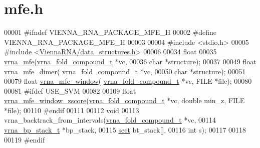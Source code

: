 \hypertarget{mfe_8h_source}{}\section{mfe.\+h}
\label{mfe_8h_source}

\begin{DoxyCode}
00001 \textcolor{preprocessor}{#ifndef VIENNA\_RNA\_PACKAGE\_MFE\_H}
00002 \textcolor{preprocessor}{#define VIENNA\_RNA\_PACKAGE\_MFE\_H}
00003 
00004 \textcolor{preprocessor}{#include <stdio.h>}
00005 \textcolor{preprocessor}{#include <\hyperlink{data__structures_8h}{ViennaRNA/data\_structures.h}>}
00006 
00034 \textcolor{keywordtype}{float}
00035 \hyperlink{group__mfe__fold_gabd3b147371ccf25c577f88bbbaf159fd}{vrna\_mfe}(\hyperlink{group__fold__compound_structvrna__fc__s}{vrna\_fold\_compound\_t} *vc,
00036           \textcolor{keywordtype}{char} *structure);
00037 
00049 \textcolor{keywordtype}{float} \hyperlink{group__mfe__cofold_gaab22d10c1190f205f16a77cab9d5d3ee}{vrna\_mfe\_dimer}( \hyperlink{group__fold__compound_structvrna__fc__s}{vrna\_fold\_compound\_t} *vc,
00050                       \textcolor{keywordtype}{char} *structure);
00051 
00079 \textcolor{keywordtype}{float} \hyperlink{group__local__mfe__fold_ga689df235a1915a1ad56e377383c044ce}{vrna\_mfe\_window}( \hyperlink{group__fold__compound_structvrna__fc__s}{vrna\_fold\_compound\_t} *vc, FILE *file);
00080 
00081 \textcolor{preprocessor}{#ifdef USE\_SVM}
00082 
00109 \textcolor{keywordtype}{float} \hyperlink{group__local__mfe__fold_gaa4f67ae94efd08d800c17f9b53423fd6}{vrna\_mfe\_window\_zscore}(\hyperlink{group__fold__compound_structvrna__fc__s}{vrna\_fold\_compound\_t} *vc, \textcolor{keywordtype}{double} 
      min\_z, FILE *file);
00110 \textcolor{preprocessor}{#endif}
00111 
00112 \textcolor{keywordtype}{void}
00113 vrna\_backtrack\_from\_intervals(\hyperlink{group__fold__compound_structvrna__fc__s}{vrna\_fold\_compound\_t} *vc,
00114                               \hyperlink{group__data__structures_structvrna__bp__stack__s}{vrna\_bp\_stack\_t} *bp\_stack,
00115                               \hyperlink{group__data__structures_structvrna__sect__s}{sect} bt\_stack[],
00116                               \textcolor{keywordtype}{int} s);
00117 
00118 
00119 \textcolor{preprocessor}{#endif}
\end{DoxyCode}
